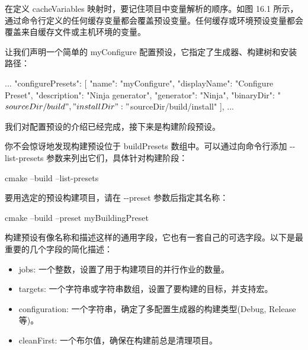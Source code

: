 在定义 cacheVariables 映射时，要记住项目中变量解析的顺序。如图 16.1 所示，通过命令行定义的任何缓存变量都会覆盖预设变量。任何缓存或环境预设变量都会覆盖来自缓存文件或主机环境的变量。


让我们声明一个简单的 myConfigure 配置预设，它指定了生成器、构建树和安装路径：


\begin{json}
...
    "configurePresets": [
        {
            "name": "myConfigure",
            "displayName": "Configure Preset",
            "description": "Ninja generator",
            "generator": "Ninja",
            "binaryDir": "${sourceDir}/build",
            "installDir": "${sourceDir}/build/install"
        }
    ],
...
\end{json}

我们对配置预设的介绍已经完成，接下来是构建阶段预设。


你不会惊讶地发现构建预设位于 buildPresets 数组中。可以通过向命令行添加 -{}-list-presets 参数来列出它们，具体针对构建阶段：

\begin{shell}
cmake --build --list-presets
\end{shell}

要用选定的预设构建项目，请在 -{}-preset 参数后指定其名称：

\begin{shell}
cmake --build --preset myBuildingPreset
\end{shell}

构建预设有像名称和描述这样的通用字段，它也有一套自己的可选字段。以下是最重要的几个字段的简化描述：

\begin{itemize}
\item
jobs: 一个整数，设置了用于构建项目的并行作业的数量。

\item
targets: 一个字符串或字符串数组，设置了要构建的目标，并支持宏。

\item
configuration: 一个字符串，确定了多配置生成器的构建类型(Debug, Release等)。

\item
cleanFirst: 一个布尔值，确保在构建前总是清理项目。
\end{itemize}


